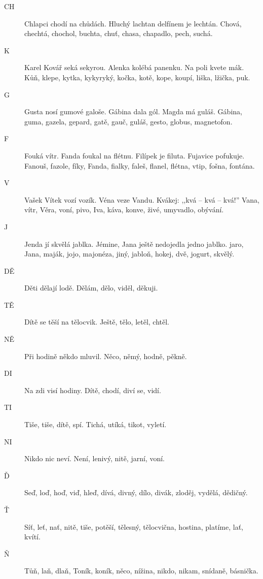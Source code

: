 \begin{multicols}{\value{columnsgames}}
\begin{description}
\item[CH] Chlapci chodí na chůdách. Hluchý lachtan delfínem je lechtán.
Chová, chechtá, chochol, buchta, chuť, chasa, chapadlo, pech, suchá.

\item[K] Karel Kovář seká sekyrou. Alenka kolébá panenku. Na poli kvete 
mák. Kůň, klepe, kytka, kykyryký, kočka, kotě, kope, koupí, liška,
lžička, puk.

\item[G] Gusta nosí gumové galoše. Gábina dala gól. Magda má guláš.
Gábina, guma, gazela, gepard, gatě, gauč, guláš, gesto, globus, magnetofon.

\item[F] Fouká vítr. Fanda foukal na flétnu. Filípek je filuta. Fujavice 
pofukuje. Fanouš, fazole, fíky, Fanda, fialky, faleš, flanel, flétna, vtip, 
fošna, fontána.

\item[V] Vašek Vítek vozí vozík. Véna veze Vandu. Kvákej: ,,kvá -- kvá 
-- kvá!'' Vana, vítr, Věra, voní, pivo, Iva, káva, konve, živé, umyvadlo, obývání.

\item[J] Jenda jí skvělá jablka. Jémine, Jana ještě nedojedla jedno jablko.
jaro, Jana, maják, jojo, majonéza, jiný, jabloň, hokej, dvě, jogurt, skvělý.

\item[DĚ] Děti dělají lodě. Dělám, dělo, viděl, děkuji.

\item[TĚ] Dítě se těší na tělocvik. Ještě, tělo, letěl, chtěl.

\item[NĚ] Při hodině někdo mluvil. Něco, němý, hodně, pěkně.

\item[DI] Na zdi visí hodiny. Dítě, chodí, diví se, vidí.

\item[TI] Tiše, tiše, dítě, spí. Tichá, utíká, tikot, vyletí.

\item[NI] Nikdo nic neví. Není, lenivý, nitě, jarní, voní.

\item[Ď] Seď, loď, hoď, viď, hleď, dívá, divný, dílo, divák, zloděj, 
vydělá, dědičný.

\item[Ť] Síť, leť, nať, nitě, tiše, potěší, tělesný, tělocvična, hostina, 
platíme, lať, kvítí.

\item[Ň] Tůň, laň, dlaň, Toník, koník, něco, nížina, nikdo, nikam, snídaně, 
básnička.

\end{description}

\end{multicols}
\clearpage

